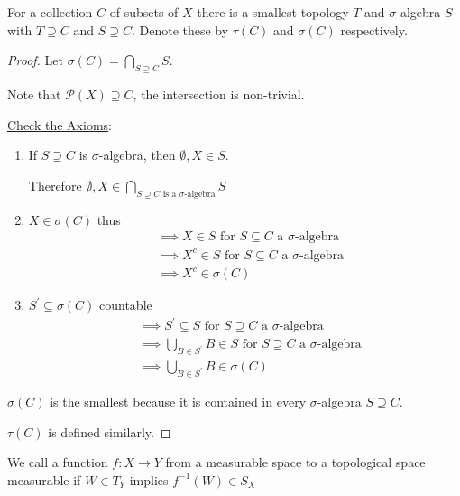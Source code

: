 \begin{theorem}
	For a collection $C$ of subsets of $X$ there is a smallest topology $T$ and $\sigma$-algebra $S$ with $T \supseteq C$ and $S \supseteq C$.
	Denote these by $\tau(C)$ and $\sigma(C)$ respectively.
\end{theorem}

\begin{proof}
	Let $\sigma(C) = \bigcap\limits_{S \supseteq C} S$.

	Note that $\mathcal{P}(X) \supseteq C$, the intersection is non-trivial.

	\underline{Check the Axioms}:
	\begin{enumerate}
		\item If $S \supseteq C$ is $\sigma$-algebra, then $\emptyset,X \in S$.

			Therefore  $\emptyset, X \in \bigcap \limits_{S \supseteq C \text{ is a $\sigma$-algebra}}S $
		\item $X \in \sigma(C)$ thus
			 \begin{align*}
			&\implies X \in S \text{ for } S \subseteq C \text{ a } \sigma\text{-algebra} \\
			&\implies X^{c} \in S \text{ for } S \subseteq C \text{ a } \sigma\text{-algebra} \\
			&\implies X^{c} \in \sigma(C)
			\end{align*} 

	\item $S^{'} \subseteq \sigma (C)$ countable
		 \begin{align*}
		&\implies S^{'} \subseteq S \text{ for } S \supseteq C \text{ a $\sigma$-algebra} \\
		&\implies \bigcup_{B \in S^{'}} B \in S \text{ for } S \supseteq C \text{ a $\sigma$-algebra} \\
		&\implies \bigcup_{B \in S^{'}} B \in \sigma(C)
		\end{align*} 
	\end{enumerate}

	$\sigma(C)$ is the smallest because it is contained in every $\sigma$-algebra $S \supseteq C$.

	 $\tau(C)$ is defined similarly.
\end{proof}

\begin{definition}
	We call a function $f:X \to Y$ from a measurable space to a topological space measurable if $W \in T_Y$ implies $f^{-1}(W) \in S_X$
\end{definition}


